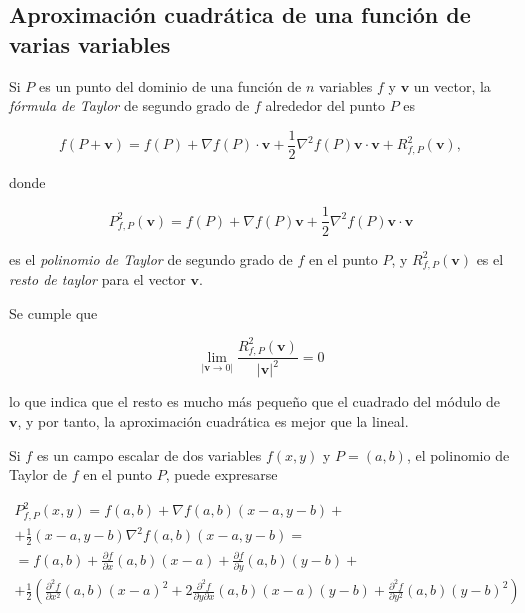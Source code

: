 \documentclass[
  a4paper,
]{scrreport}
\theoremstyle{definition}
\theoremstyle{plain}
\theoremstyle{plain}
\theoremstyle{definition}
\theoremstyle{definition}
\theoremstyle{plain}
\theoremstyle{remark}
\begin{document}
\hypertarget{aproximaciuxf3n-cuadruxe1tica-de-una-funciuxf3n-de-varias-variables}{%
\subsection{Aproximación cuadrática de una función de varias
variables}\label{aproximaciuxf3n-cuadruxe1tica-de-una-funciuxf3n-de-varias-variables}}

Si \(P\) es un punto del dominio de una función de \(n\) variables \(f\)
y \(\mathbf{v}\) un vector, la \emph{fórmula de Taylor} de segundo grado
de \(f\) alrededor del punto \(P\) es

\[
f(P+\mathbf{v}) = f(P) + \nabla f(P)\cdot \mathbf{v} + \frac{1}{2}\nabla^2f(P)\mathbf{v}\cdot\mathbf{v} + R^2_{f,P}(\mathbf{v}),
\]

donde

\[
P^2_{f,P}(\mathbf{v}) = f(P)+\nabla f(P)\mathbf{v}+\frac{1}{2}\nabla^2f(P)\mathbf{v}\cdot\mathbf{v}
\]

es el \emph{polinomio de Taylor} de segundo grado de \(f\) en el punto
\(P\), y \(R^2_{f,P}(\mathbf{v})\) es el \emph{resto de taylor} para el
vector \(\mathbf{v}\).

Se cumple que

\[
\lim_{|\mathbf{v}\rightarrow 0|} \frac{R^2_{f,P}(\mathbf{v})}{|\mathbf{v}|^2} = 0
\]

lo que indica que el resto es mucho más pequeño que el cuadrado del
módulo de \(\mathbf{v}\), y por tanto, la aproximación cuadrática es
mejor que la lineal.

Si \(f\) es un campo escalar de dos variables \(f(x,y)\) y \(P=(a, b)\),
el polinomio de Taylor de \(f\) en el punto \(P\), puede expresarse

\[
\begin{gathered}
P^2_{f,P}(x,y) = f(a,b)+\nabla f(a,b)(x-a,y-b) +\\
+\frac{1}{2}(x-a,y-b)\nabla^2f(a,b)(x-a,y-b)= \\
= f(a,b)+\frac{\partial f}{\partial x}(a,b)(x-a)+\frac{\partial f}{\partial y}(a,b)(y-b)+\\
+\frac{1}{2}\left(\frac{\partial^2 f}{\partial x^2}(a,b) (x-a)^2 + 2\frac{\partial^2 f}{\partial y\partial x}(a,b) (x-a)(y-b) + \frac{\partial^2 f}{\partial y^2}(a,b) (y-b)^2\right)
\end{gathered}
\]
\end{document}
